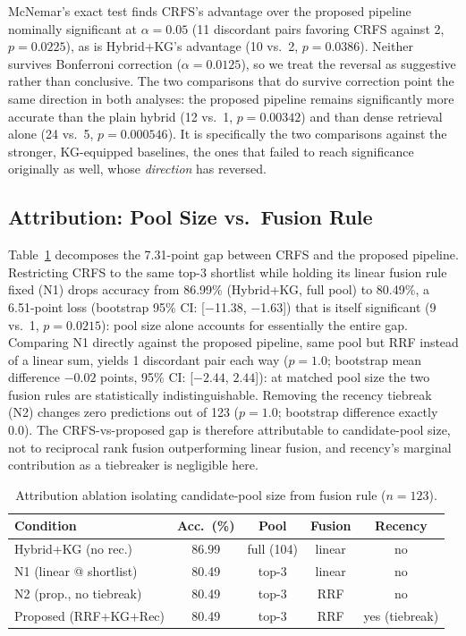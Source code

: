 \documentclass[10pt,conference]{IEEEtran}
\begin{document}
McNemar's exact test finds CRFS's advantage over the proposed pipeline nominally significant at $\alpha=0.05$ (11 discordant pairs favoring CRFS against 2, $p=0.0225$), as is Hybrid+KG's advantage (10 vs.\ 2, $p=0.0386$). Neither survives Bonferroni correction ($\alpha=0.0125$), so we treat the reversal as suggestive rather than conclusive. The two comparisons that do survive correction point the same direction in both analyses: the proposed pipeline remains significantly more accurate than the plain hybrid (12 vs.\ 1, $p=0.00342$) and than dense retrieval alone (24 vs.\ 5, $p=0.000546$). It is specifically the two comparisons against the stronger, KG-equipped baselines, the ones that failed to reach significance originally as well, whose \emph{direction} has reversed.

\subsection{Attribution: Pool Size vs.\ Fusion Rule}

Table~\ref{tab:attribution} decomposes the 7.31-point gap between CRFS and the proposed pipeline. Restricting CRFS to the same top-3 shortlist while holding its linear fusion rule fixed (N1) drops accuracy from 86.99\% (Hybrid+KG, full pool) to 80.49\%, a 6.51-point loss (bootstrap 95\% CI: [$-$11.38, $-$1.63]) that is itself significant (9 vs.\ 1, $p=0.0215$): pool size alone accounts for essentially the entire gap. Comparing N1 directly against the proposed pipeline, same pool but RRF instead of a linear sum, yields 1 discordant pair each way ($p=1.0$; bootstrap mean difference $-0.02$ points, 95\% CI: [$-2.44$, $2.44$]): at matched pool size the two fusion rules are statistically indistinguishable. Removing the recency tiebreak (N2) changes zero predictions out of 123 ($p=1.0$; bootstrap difference exactly 0.0). The CRFS-vs-proposed gap is therefore attributable to candidate-pool size, not to reciprocal rank fusion outperforming linear fusion, and recency's marginal contribution as a tiebreaker is negligible here.

\begin{table}[t]
\centering
\caption{Attribution ablation isolating candidate-pool size from fusion rule ($n=123$).}
\label{tab:attribution}
\footnotesize
\setlength{\tabcolsep}{3pt}
\begin{tabular}{lcccc}
\toprule
\textbf{Condition} & \textbf{Acc.\ (\%)} & \textbf{Pool} & \textbf{Fusion} & \textbf{Recency} \\
\midrule
Hybrid+KG (no rec.) & 86.99 & full (104) & linear & no \\
N1 (linear @ shortlist) & 80.49 & top-3 & linear & no \\
N2 (prop., no tiebreak) & 80.49 & top-3 & RRF & no \\
Proposed (RRF+KG+Rec) & 80.49 & top-3 & RRF & yes (tiebreak) \\
\bottomrule
\end{tabular}
\end{table}
\end{document}

